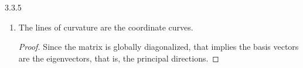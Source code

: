 \documentclass[11pt]{article}
\begin{document}
\begin{problem}{3.3.5}
\begin{enumerate}[label=(\alph*)]
        \begin{proof}
          The principal curvatures are the eigenvalues of the Weingarten map.
          We have
          \begin{equation}
          \label{eq:26}
          \mathrm{I\!I} \doteq \begin{pmatrix}
2  & 0 \\
0  & -2
          \end{pmatrix},
        \end{equation}
        and then \( L_i^j = g^{jk}\mathrm{I\!I}_{ik} \), which written in matrix form is
        \begin{equation}
        \label{eq:27}
        \begin{aligned}
        \begin{pmatrix}
L_1^1  & L_1^2 \\
L_2^1  & L_2^2
 \end{pmatrix} &= \begin{pmatrix}
g^{11}  & g^{12} \\
g^{21}  & g^{22}
 \end{pmatrix} \begin{pmatrix}
e  & f \\
f  & g
 \end{pmatrix} \\
          &= \begin{pmatrix}
(1 + u^2 + v^2)^{-2}  & 0 \\
0                     & (1 + u^2 + v^2)^{-2}
 \end{pmatrix} \begin{pmatrix}
2  & 0 \\
0  & -2
 \end{pmatrix} \\
          &= \begin{pmatrix}
2(1 + u^2 + v^2)^{-2}  & 0 \\
0                      & -2(1 + u^2 + v^2)^{-2}
 \end{pmatrix}.
        \end{aligned}
      \end{equation}
      This matrix is already diagonalized, so the eigenvalues lie on the diagonal, which match with \cref{eq:7}.
\end{proof}
  \item The lines of curvature are the coordinate curves.
        \begin{proof}
          Since the matrix is globally diagonalized, that implies the basis vectors are the eigenvectors, that is, the principal directions.

\end{proof}
\end{enumerate}
\end{problem}
\end{document}
